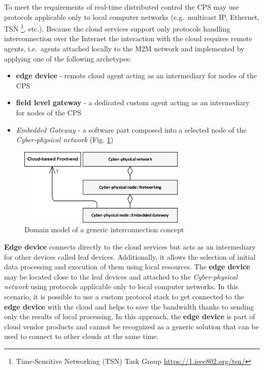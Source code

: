 \documentclass[runningheads]{llncs}
\begin{document}
To meet the requirements of real-time distributed control the CPS may use protocols applicable only to local computer networks (e.g.~multicast IP, Ethernet, TSN \footnote{Time-Sensitive Networking (TSN) Task Group \url{https://1.ieee802.org/tsn/}}, etc.). Because the cloud services support only protocols handling interconnection over the Internet the interaction with the cloud requires remote agents, i.e.~agents attached locally to the M2M network and implemented by applying one of the following archetypes:

\begin{itemize}
      \item \textbf{edge device} - remote cloud agent acting as an intermediary for nodes of the CPS
      \item \textbf{field level gateway} - a dedicated custom agent acting as an intermediary for nodes of the CPS
      \item \emph{Embedded Gateway} - a software part composed into a selected node of the \emph{Cyber-physical network} (Fig. \ref{figure1.StrategyDomainModel})
\end{itemize}

\begin{figure}
      \centering
      \includegraphics[width=8cm]{../../.Media/StrategyDomainModel.png}
      \caption{Domain model of a generic interconnection concept}\label{figure1.StrategyDomainModel}
\end{figure}

\textbf{Edge device} connects directly to the cloud services but acts as an intermediary for other devices called leaf devices. Additionally, it allows the selection of initial data processing and execution of them using local resources. The \textbf{edge device} may be located close to the leaf devices and attached to the \emph{Cyber-physical network} using protocols applicable only to local computer networks. In this scenario, it is possible to use a custom protocol stack to get connected to the \textbf{edge device} with the cloud and helps to save the bandwidth thanks to sending only the results of local processing. In this approach, the \textbf{edge device} is part of cloud vendor products and cannot be recognized as a generic solution that can be used to connect to other clouds at the same time.
\end{document}
